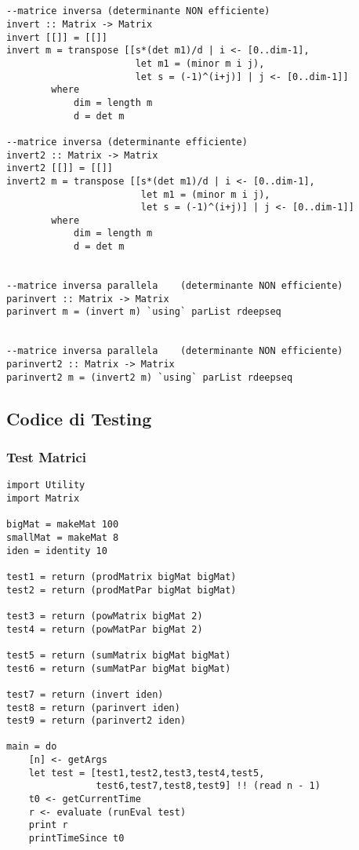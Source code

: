 \begin{verbatim}
        
        
--matrice inversa (determinante NON efficiente)
invert :: Matrix -> Matrix
invert [[]] = [[]]
invert m = transpose [[s*(det m1)/d | i <- [0..dim-1], 
                       let m1 = (minor m i j), 
                       let s = (-1)^(i+j)] | j <- [0..dim-1]]
        where
            dim = length m
            d = det m

--matrice inversa (determinante efficiente)        
invert2 :: Matrix -> Matrix
invert2 [[]] = [[]]
invert2 m = transpose [[s*(det m1)/d | i <- [0..dim-1], 
                        let m1 = (minor m i j), 
                        let s = (-1)^(i+j)] | j <- [0..dim-1]]
        where
            dim = length m
            d = det m
            
            
--matrice inversa parallela    (determinante NON efficiente)            
parinvert :: Matrix -> Matrix            
parinvert m = (invert m) `using` parList rdeepseq


--matrice inversa parallela    (determinante NON efficiente)    
parinvert2 :: Matrix -> Matrix            
parinvert2 m = (invert2 m) `using` parList rdeepseq
\end{verbatim}
\subsection{Codice di Testing}
\subsubsection{Test Matrici}
\begin{verbatim}
import Utility
import Matrix

bigMat = makeMat 100
smallMat = makeMat 8
iden = identity 10

test1 = return (prodMatrix bigMat bigMat)
test2 = return (prodMatPar bigMat bigMat)

test3 = return (powMatrix bigMat 2)
test4 = return (powMatPar bigMat 2)

test5 = return (sumMatrix bigMat bigMat)
test6 = return (sumMatPar bigMat bigMat)

test7 = return (invert iden)
test8 = return (parinvert iden)
test9 = return (parinvert2 iden)

main = do
    [n] <- getArgs
    let test = [test1,test2,test3,test4,test5,
                test6,test7,test8,test9] !! (read n - 1)
    t0 <- getCurrentTime
    r <- evaluate (runEval test)
    print r
    printTimeSince t0
\end{verbatim}
